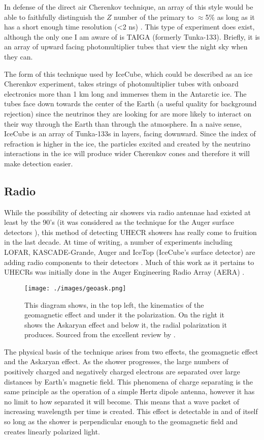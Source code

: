 In defense of the direct air Cherenkov technique, an array of this style would be able to faithfully distinguish the $Z$ number of the primary to $\approx$5\% as long as it has a short enough time resolution (\textless 2 ns) \cite{swordyair}. This type of experiment does exist, although the only one I am aware of  is TAIGA (formerly Tunka-133). Briefly, it is an array of upward facing photomultiplier tubes that view the night sky when they can.

The form of this technique used by IceCube, which could be described as an ice Cherenkov experiment, takes strings of photomultiplier tubes with onboard electronics more than 1 km long and immerses them in the Antarctic ice. The tubes face down towards the center of the Earth (a useful quality for background rejection) since the neutrinos they are looking for are more likely to interact on their way through the Earth than through the atmosphere. In a naive sense, IceCube is an array of Tunka-133s in layers, facing downward. Since the index of refraction is higher in the ice, the particles excited and created by the neutrino interactions in the ice will produce wider Cherenkov cones and therefore it will make detection easier.

\subsection{Radio}
\label{radio}
While the possibility of detecting air showers via radio antennae had existed at least by the 90's (it was considered as the technique for the Auger surface detectors \cite{firstcher}), this method of detecting UHECR showers has really come to fruition in the last decade. At time of writing, a number of experiments including LOFAR, KASCADE-Grande, Auger and IceTop (IceCube's surface detector) are adding radio components to their detectors \cite{schroeder}. Much of this work as it pertains to UHECRs was initially done in the Auger Engineering Radio Array (AERA) \cite{radioaera}. 
\begin{figure}[h!]
\begin{center}
\texttt{[image: ./images/geoask.png]}
\caption[Radio Emission Diagram]{This diagram shows, in the top left, the kinematics of the geomagnetic effect and under it the polarization. On the right it shows the Askaryan effect and below it, the radial polarization it produces. Sourced from the excellent review by \textcite{schroeder}.}
\label{rademission}
\end{center}
\end{figure}
The physical basis of the technique arises from two effects, the geomagnetic effect and the Askaryan effect. As the shower progresses, the large numbers of positively charged and negatively charged electrons are separated over large distances by Earth's magnetic field. This phenomena of charge separating is the same principle as the operation of a simple Hertz dipole antenna, however it has no limit to how separated it will become. This means that a wave packet of increasing wavelength per time is created. This effect is detectable in and of itself so long as the shower is perpendicular enough to the geomagnetic field and creates linearly polarized light. 


